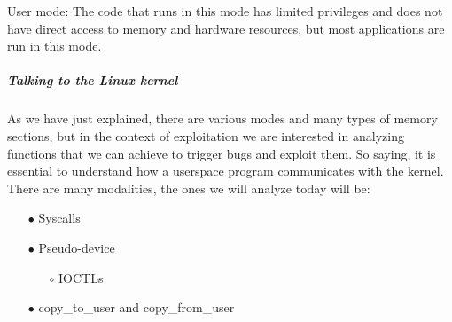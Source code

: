    User mode: The code that runs in this mode has limited privileges and does not have direct access to memory and hardware resources, but most applications are run in this mode.\newline
    \subparagraph{Talking to the Linux kernel}
    As we have just explained, there are various modes and many types of memory sections, but in the context of exploitation we are interested in analyzing functions that we can achieve to trigger bugs and exploit them.\newline
    So saying, it is essential to understand how a userspace program communicates with the kernel.\newline
    There are many modalities, the ones we will analyze today will be:\newline
    \begin{itemize}
        \item[$\bullet$] Syscalls
        \item[$\bullet$] Pseudo-device
        \begin{itemize}
            \item[$\circ$] IOCTLs
        \end{itemize}
        \item[$\bullet$] copy\_to\_user and copy\_from\_user

    \end{itemize}

